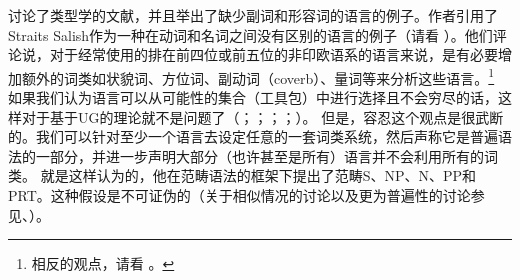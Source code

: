  \citet[\S~2.2.4]{EL2009a}讨论了类型学的文献，并且举出了缺少副词和形容词的语言的例子。作者引用了Straits Salish作为一种在动词和名词之间没有区别的语言的例子（请看 \citealp[]{EL2009b}）。他们评论说，对于经常使用的排在前四位或前五位的非印欧语系的语言来说，是有必要增加额外的词类如状貌词、方位词、副动词（coverb）、量词等来分析这些语言。\footnote{%
相反的观点，请看 。
} 
如果我们认为语言可以从可能性的集合（工具包）中进行选择且不会穷尽的话，这样对于基于UG的理论就不是问题了（\citealp[]{Jackendoff2002a-u}；\citealp[]{Newmeyer2005a}；\citealp*[]{FHC2005a}；\citealp[--7]{Chomsky2007a}；\citealp[, 58, 65]{CR2010a}）。
但是，容忍这个观点是很武断的。我们可以针对至少一个语言去设定任意的一套词类系统，然后声称它是普遍语法的一部分，并进一步声明大部分（也许甚至是所有）语言并不会利用所有的词类。 \citet[]{Villavicencio2002a}就是这样认为的，他在范畴语法的框架下提出了范畴S、NP、N、PP和PRT。这种假设是不可证伪的（关于相似情况的讨论以及更为普遍性的讨论参见\citealp[]{EL2009a}、\citealp[]{Tomasello2009a}）。

